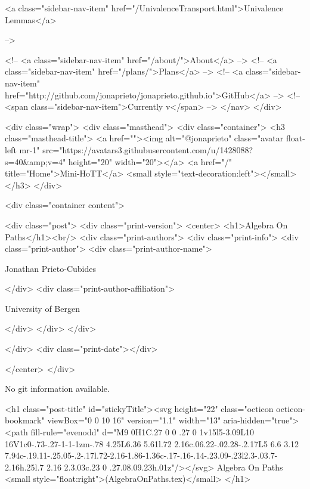       
    
      
        
          <a class="sidebar-nav-item" href="/UnivalenceTransport.html">Univalence Lemmas</a>
        
      
     -->

    <!-- <a class="sidebar-nav-item" href="/about/">About</a> -->
    <!-- <a class="sidebar-nav-item" href="/plans/">Plans</a> -->
    <!-- <a class="sidebar-nav-item" href="http://github.com/jonaprieto/jonaprieto.github.io">GitHub</a> -->
    <!-- <span class="sidebar-nav-item">Currently v</span> -->
  </nav>
</div>

    <div class="wrap">
      <div class="masthead">
        <div class="container">
          <h3 class="masthead-title">
            <a href=""><img alt="@jonaprieto" class="avatar float-left mr-1" src="https://avatars3.githubusercontent.com/u/1428088?s=40&amp;v=4" height="20" width="20"></a>
            <a href="/" title="Home">Mini-HoTT</a>
            <small style="text-decoration:left"></small>
          </h3>
        </div>
      
      <div class="container content">
        







<div class="post">
  <div class="print-version">
    <center>
      <h1>Algebra On Paths</h1><br/>
        <div class="print-authors">
          <div class="print-info">
            <div class="print-author">
              <div class="print-author-name">
                
                  Jonathan Prieto-Cubides
                
              </div>
              <div class="print-author-affiliation">
                
                  University of Bergen
                
                </div>
            </div>
          </div>
          
          
        </div>
        <div class="print-date"></div>
        
        
    </center>
  </div>

  
  No git information available.
  

  <h1 class="post-title" id="stickyTitle"><svg height="22" class="octicon octicon-bookmark" viewBox="0 0 10 16" version="1.1" width="13" aria-hidden="true"><path fill-rule="evenodd" d="M9 0H1C.27 0 0 .27 0 1v15l5-3.09L10 16V1c0-.73-.27-1-1-1zm-.78 4.25L6.36 5.61l.72 2.16c.06.22-.02.28-.2.17L5 6.6 3.12 7.94c-.19.11-.25.05-.2-.17l.72-2.16-1.86-1.36c-.17-.16-.14-.23.09-.23l2.3-.03.7-2.16h.25l.7 2.16 2.3.03c.23 0 .27.08.09.23h.01z"/></svg> Algebra On Paths <small style="float:right">(AlgebraOnPaths.tex)</small>
  </h1>

